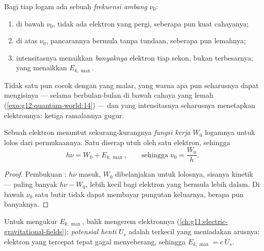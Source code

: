 \begin{proposition}\label{prop:g12:quantum-world:facts}
Bagi tiap logam ada sebuah \emph{frekuensi ambang} $\nu_0$:
\begin{enumerate}
  \item di bawah $\nu_0$, tidak ada elektron yang pergi, seberapa pun kuat cahayanya;
  \item di atas $\nu_0$, pancarannya bermula tanpa tundaan, seberapa pun lemahnya;
  \item intensitasnya menaikkan \emph{banyaknya} elektron tiap sekon, bukan
         terbesarnya;  yang menaikkan $E_{k,\max}$.
\end{enumerate}
Tidak satu pun cocok dengan  yang malar, yang warna apa pun seharusnya dapat mengisinya ---
selama berbulan-bulan di bawah cahaya yang lemah (\cref{exo:g12:quantum-world:14}) --- dan yang
intensitasnya seharusnya menetapkan  elektronnya: ketiga ramalannya gugur.
\end{proposition}
\admitted

\begin{theorem}\label{thm:g12:quantum-world:einstein}
Sebuah elektron menuntut sekurang-kurangnya \emph{fungsi
kerja} $W_0$ logamnya untuk lolos dari permukaannya.
Satu  diserap utuh oleh satu elektron, sehingga
\[
h\nu = W_0 + E_{k,\max}, \qquad \text{sehingga } \nu_0 = \frac{W_0}{h}.
\]
\end{theorem}

\begin{proof}
Pembukuan : $h\nu$ masuk, $W_0$ dibelanjakan untuk lolosnya, sisanya kinetik ---
paling banyak $h\nu - W_0$, lebih kecil bagi elektron yang bermula lebih dalam. Di bawah $\nu_0$
satu butir tidak dapat membayar pungutan keluarnya, berapa pun banyaknya.
\end{proof}

\begin{definition}\label{def:g12:quantum-world:stopping}
Untuk mengukur $E_{k,\max}$,  balik mengerem elektronnya
(\cref{ch:g11:electric-gravitational-fields}); \emph{potensial
henti} $U_s$ adalah  terkecil yang meniadakan
arusnya: elektron yang tercepat tepat gagal menyeberang, sehingga $E_{k,\max} = e\,U_s$.
\end{definition}

